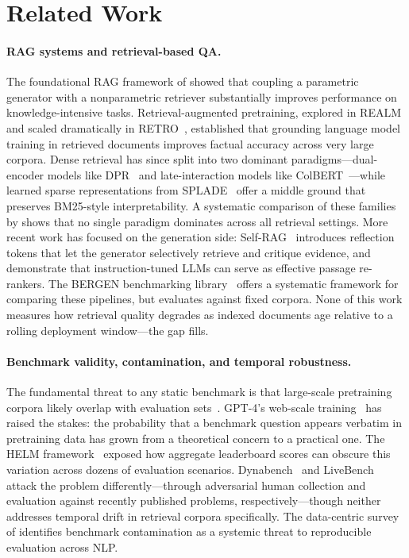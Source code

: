 \section{Related Work}
\label{sec:related}

\paragraph{RAG systems and retrieval-based QA.}
The foundational RAG framework of \citet{lewis2020rag} showed that coupling a parametric generator with a nonparametric retriever substantially improves performance on knowledge-intensive tasks. Retrieval-augmented pretraining, explored in REALM~\citep{guu2020realm} and scaled dramatically in RETRO~\citep{borgeaud2022retro}, established that grounding language model training in retrieved documents improves factual accuracy across very large corpora. Dense retrieval has since split into two dominant paradigms---dual-encoder models like DPR~\citep{karpukhin2020dpr} and late-interaction models like ColBERT~\citep{khattab2020colbert}---while learned sparse representations from SPLADE~\citep{formal2021splade} offer a middle ground that preserves BM25-style interpretability. A systematic comparison of these families by \citet{luan2021sparse} shows that no single paradigm dominates across all retrieval settings. More recent work has focused on the generation side: Self-RAG~\citep{asai2024selfrag} introduces reflection tokens that let the generator selectively retrieve and critique evidence, and \citet{pradeep2023rankgpt} demonstrate that instruction-tuned LLMs can serve as effective passage re-rankers. The BERGEN benchmarking library~\citep{thakur2024bergen} offers a systematic framework for comparing these pipelines, but evaluates against fixed corpora. None of this work measures how retrieval quality degrades as indexed documents age relative to a rolling deployment window---the gap \method{} fills.

\paragraph{Benchmark validity, contamination, and temporal robustness.}
The fundamental threat to any static benchmark is that large-scale pretraining corpora likely overlap with evaluation sets~\citep{magar2022data,golchin2023time}. GPT-4's web-scale training~\citep{openai2024gpt4} has raised the stakes: the probability that a benchmark question appears verbatim in pretraining data has grown from a theoretical concern to a practical one. The HELM framework~\citep{liang2022helm} exposed how aggregate leaderboard scores can obscure this variation across dozens of evaluation scenarios. Dynabench~\citep{kiela2021dynabench} and LiveBench~\citep{white2024livebench} attack the problem differently---through adversarial human collection and evaluation against recently published problems, respectively---though neither addresses temporal drift in retrieval corpora specifically. The data-centric survey of \citet{longpre2023pretraining} identifies benchmark contamination as a systemic threat to reproducible evaluation across NLP.

